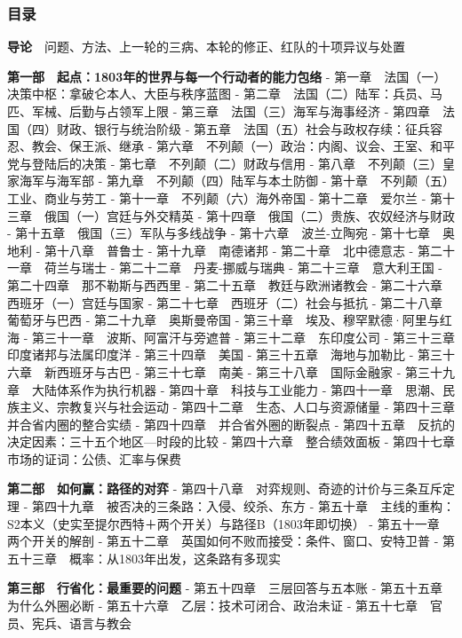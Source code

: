 \documentclass[
  10pt,
  a4paper,
]{article}
\newcommand{\literalquote}{{\addfontfeatures{Mapping=}\char34}}
\begin{document}
\subsubsection{目录}\label{ux76eeux5f55}

\textbf{导论}　问题、方法、上一轮的三病、本轮的修正、红队的十项异议与处置

\textbf{第一部　起点：1803年的世界与每一个行动者的能力包络} -
第一章　法国（一）决策中枢：拿破仑本人、大臣与秩序蓝图 -
第二章　法国（二）陆军：兵员、马匹、军械、后勤与占领军上限 -
第三章　法国（三）海军与海事经济 -
第四章　法国（四）财政、银行与统治阶级 -
第五章　法国（五）社会与政权存续：征兵容忍、教会、保王派、继承 -
第六章　不列颠（一）政治：内阁、议会、王室、和平党与登陆后的决策 -
第七章　不列颠（二）财政与信用 - 第八章　不列颠（三）皇家海军与海军部 -
第九章　不列颠（四）陆军与本土防御 -
第十章　不列颠（五）工业、商业与劳工 - 第十一章　不列颠（六）海外帝国 -
第十二章　爱尔兰 - 第十三章　俄国（一）宫廷与外交精英 -
第十四章　俄国（二）贵族、农奴经济与财政 -
第十五章　俄国（三）军队与多线战争 - 第十六章　波兰-立陶宛 -
第十七章　奥地利 - 第十八章　普鲁士 - 第十九章　南德诸邦 -
第二十章　北中德意志 - 第二十一章　荷兰与瑞士 -
第二十二章　丹麦-挪威与瑞典 - 第二十三章　意大利王国 -
第二十四章　那不勒斯与西西里 - 第二十五章　教廷与欧洲诸教会 -
第二十六章　西班牙（一）宫廷与国家 - 第二十七章　西班牙（二）社会与抵抗
- 第二十八章　葡萄牙与巴西 - 第二十九章　奥斯曼帝国 -
第三十章　埃及、穆罕默德·阿里与红海 - 第三十一章　波斯、阿富汗与旁遮普 -
第三十二章　东印度公司 - 第三十三章　印度诸邦与法属印度洋 -
第三十四章　美国 - 第三十五章　海地与加勒比 - 第三十六章　新西班牙与古巴
- 第三十七章　南美 - 第三十八章　国际金融家 -
第三十九章　大陆体系作为执行机器 - 第四十章　科技与工业能力 -
第四十一章　思潮、民族主义、宗教复兴与社会运动 -
第四十二章　生态、人口与资源储量 - 第四十三章　并合省内圈的整合实绩 -
第四十四章　并合省外圈的断裂点 -
第四十五章　反抗的决定因素：三十五个地区---时段的比较 -
第四十六章　整合绩效面板 - 第四十七章　市场的证词：公债、汇率与保费

\textbf{第二部　如何赢：路径的对弈} -
第四十八章　对弈规则、奇迹的计价与三条互斥定理 -
第四十九章　被否决的三条路：入侵、绞杀、东方 -
第五十章　主线的重构：S2本义（史实至提尔西特＋两个开关）与路径B（1803年即切换）
- 第五十一章　两个开关的解剖 -
第五十二章　英国如何\literalquote{}不败而接受\literalquote{}：条件、窗口、安特卫普 -
第五十三章　概率：从1803年出发，这条路有多现实

\textbf{第三部　行省化：最重要的问题} - 第五十四章　三层回答与五本账 -
第五十五章　为什么外圈必断 - 第五十六章　乙层：技术可闭合、政治未证 -
第五十七章　官员、宪兵、语言与教会
\end{document}
